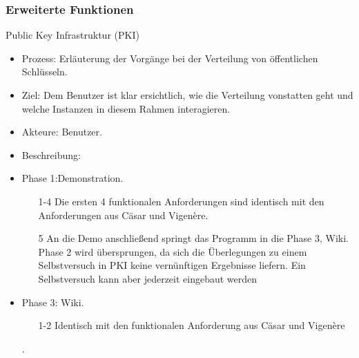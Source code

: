 \documentclass{article}
\begin{document}
\subsubsection{Erweiterte Funktionen}


\begin{FA}[start=500]
\item Public Key Infrastruktur (PKI)
\end{FA}
\begin{itemize}[label={}]
\item Prozess: Erläuterung der Vorgänge bei der Verteilung von öffentlichen Schlüsseln.
\item Ziel: Dem Benutzer ist klar ersichtlich, wie die Verteilung vonstatten geht und welche Instanzen in diesem Rahmen 
            interagieren.
\item Akteure: Benutzer.
\item Beschreibung:
\item Phase 1:Demonstration.
\begin{enumerate}
 \item[1-4] Die ersten 4 funktionalen Anforderungen sind identisch mit den Anforderungen aus Cäsar und Vigenère. 
 \item[5] An die Demo anschließend springt das Programm in die Phase 3, Wiki. Phase 2 wird übersprungen, 
          da sich die Überlegungen zu einem Selbstversuch in PKI keine vernünftigen Ergebnisse liefern. 
          Ein Selbstversuch kann aber jederzeit eingebaut werden
\end{enumerate}
\item Phase 3: Wiki.
\begin{enumerate}
 \item[1-2] Identisch mit den funktionalen Anforderung aus Cäsar und Vigenère
\end{enumerate}.
\end{itemize}
\end{document}
